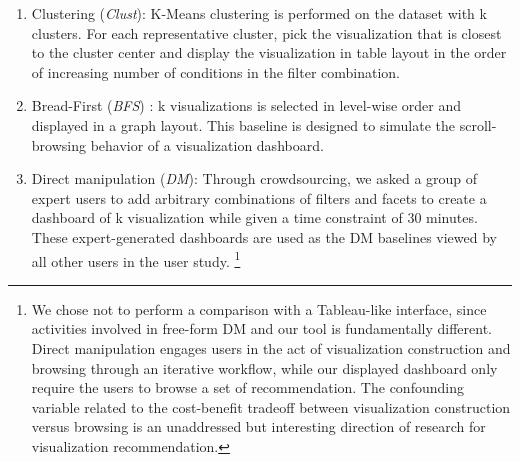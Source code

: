 \begin{enumerate}
	\item Clustering (\textit{Clust}): K-Means clustering is performed on the dataset with k clusters. For each representative cluster, pick the visualization that is closest to the cluster center and display the visualization in table layout in the order of increasing number of conditions in the filter combination.
	\item Bread-First (\textit{BFS}) : k visualizations is selected in level-wise order and displayed in a graph layout. This baseline is designed to simulate the scroll-browsing behavior of a visualization dashboard.
	\item Direct manipulation (\textit{DM}): Through crowdsourcing, we asked a group of expert users to add arbitrary combinations of filters and facets to create a dashboard of k visualization while given a time constraint of 30 minutes. These expert-generated dashboards are used as the DM baselines viewed by all other users in the user study. \footnote{We chose not to perform a comparison with a Tableau-like interface, since activities involved in free-form DM and our tool is fundamentally different. Direct manipulation engages users in the act of visualization construction and browsing through an iterative workflow, while our displayed dashboard only require the users to browse a set of recommendation. The confounding variable related to the cost-benefit tradeoff between visualization construction versus browsing is an unaddressed but interesting direction of research for visualization recommendation.}
\end{enumerate}
